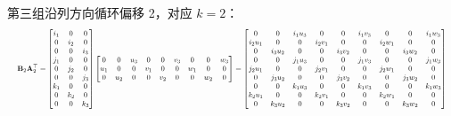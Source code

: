 ﻿\documentclass[UTF8,a4paper,11pt]{ctexart}
\begin{document}
第三组沿列方向循环偏移 2，对应 $k=2$：
\[
\resizebox{\linewidth}{!}{$\displaystyle
\mathbf{B}_2 \mathbf{A}_2^\top =
\begin{bmatrix}
i_1 & 0 & 0 \\ 0 & i_2 & 0 \\ 0 & 0 & i_3 \\
j_1 & 0 & 0 \\ 0 & j_2 & 0 \\ 0 & 0 & j_3 \\
k_1 & 0 & 0 \\ 0 & k_2 & 0 \\ 0 & 0 & k_3
\end{bmatrix}
\begin{bmatrix}
0 & 0 & u_3 & 0 & 0 & v_3 & 0 & 0 & w_3 \\
u_1 & 0 & 0 & v_1 & 0 & 0 & w_1 & 0 & 0 \\
0 & u_2 & 0 & 0 & v_2 & 0 & 0 & w_2 & 0
\end{bmatrix}
=
\begin{bmatrix}
0 & 0 & i_1 u_3 & 0 & 0 & i_1 v_3 & 0 & 0 & i_1 w_3 \\
i_2 u_1 & 0 & 0 & i_2 v_1 & 0 & 0 & i_2 w_1 & 0 & 0 \\
0 & i_3 u_2 & 0 & 0 & i_3 v_2 & 0 & 0 & i_3 w_2 & 0 \\
0 & 0 & j_1 u_3 & 0 & 0 & j_1 v_3 & 0 & 0 & j_1 w_3 \\
j_2 u_1 & 0 & 0 & j_2 v_1 & 0 & 0 & j_2 w_1 & 0 & 0 \\
0 & j_3 u_2 & 0 & 0 & j_3 v_2 & 0 & 0 & j_3 w_2 & 0 \\
0 & 0 & k_1 u_3 & 0 & 0 & k_1 v_3 & 0 & 0 & k_1 w_3 \\
k_2 u_1 & 0 & 0 & k_2 v_1 & 0 & 0 & k_2 w_1 & 0 & 0 \\
0 & k_3 u_2 & 0 & 0 & k_3 v_2 & 0 & 0 & k_3 w_2 & 0
\end{bmatrix}
$}
\]
\end{document}
